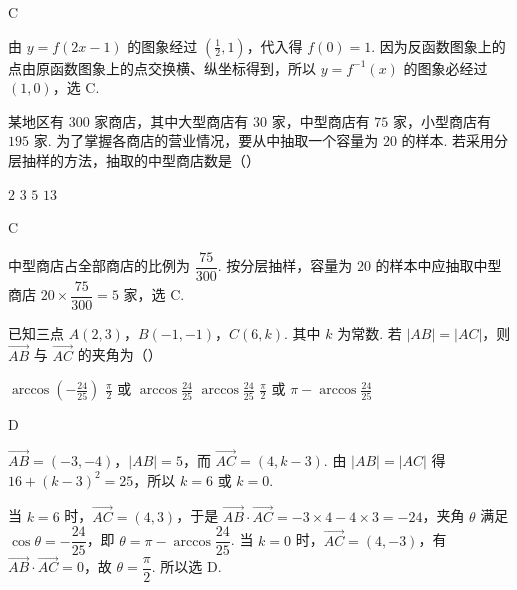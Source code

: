 \begin{answer}
C
\end{answer}

\begin{solution}
由 \(y=f(2x-1)\) 的图象经过 \(\left(\frac12,1\right)\)，代入得 \(f(0)=1\). 因为反函数图象上的点由原函数图象上的点交换横、纵坐标得到，所以 \(y=f^{-1}(x)\) 的图象必经过 \((1,0)\)，选 C.
\end{solution}

\begin{problem}
某地区有 \(300\) 家商店，其中大型商店有 \(30\) 家，中型商店有 \(75\) 家，小型商店有 \(195\) 家. 为了掌握各商店的营业情况，要从中抽取一个容量为 \(20\) 的样本. 若采用分层抽样的方法，抽取的中型商店数是（\quad）

\choices
    {\(2\)}
    {\(3\)}
    {\(5\)}
    {\(13\)}
\end{problem}

\begin{answer}
C
\end{answer}

\begin{solution}
中型商店占全部商店的比例为 \(\dfrac{75}{300}\). 按分层抽样，容量为 \(20\) 的样本中应抽取中型商店
\(20\times\dfrac{75}{300}=5\) 家，选 C.
\end{solution}

\begin{problem}
已知三点 \(A(2,3)\)，\(B(-1,-1)\)，\(C(6,k)\). 其中 \(k\) 为常数. 若 \(\left|AB\right| = \left|AC\right|\)，则 \(\overrightarrow{AB}\) 与 \(\overrightarrow{AC}\) 的夹角为（\quad）

\choices
    {\(\arccos \left(-\frac{24}{25}\right)\)}
    {\(\frac{\pi}{2}\) 或 \(\arccos \frac{24}{25}\)}
    {\(\arccos \frac{24}{25}\)}
    {\(\frac{\pi}{2}\) 或 \(\pi -\arccos \frac{24}{25}\)}
\end{problem}

\begin{answer}
D
\end{answer}

\begin{solution}
\(\overrightarrow{AB}=(-3,-4)\)，\(|AB|=5\)，而 \(\overrightarrow{AC}=(4,k-3)\). 由 \(|AB|=|AC|\) 得
\(16+(k-3)^2=25\)，所以 \(k=6\) 或 \(k=0\).

当 \(k=6\) 时，\(\overrightarrow{AC}=(4,3)\)，于是
\(\overrightarrow{AB}\cdot\overrightarrow{AC}=-3\times4-4\times3=-24\)，夹角 \(\theta\) 满足 \(\cos\theta=-\dfrac{24}{25}\)，即 \(\theta=\pi-\arccos\dfrac{24}{25}\). 当 \(k=0\) 时，\(\overrightarrow{AC}=(4,-3)\)，有 \(\overrightarrow{AB}\cdot\overrightarrow{AC}=0\)，故 \(\theta=\dfrac\pi2\). 所以选 D.
\end{solution}

